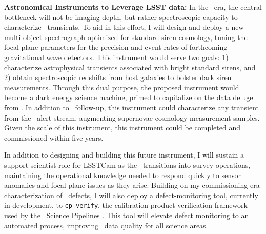 \textbf{Astronomical Instruments to Leverage LSST data:}
In the \LSST\ era, the central bottleneck will not be imaging depth, but rather spectroscopic capacity to characterize \LSST\ transients. To aid in this effort, I will design and deploy a new multi-object spectrograph optimized for standard siren cosmology, tuning the focal plane parameters for the precision and event rates of forthcoming gravitational wave detectors. This instrument would serve two goals: 1) characterize astrophysical transients associated with bright standard sirens, and 2) obtain spectroscopic redshifts from host galaxies to bolster dark siren measurements. Through this dual purpose, the proposed instrument would become a dark energy science machine, primed to capitalize on the data deluge from \LSST. In addition to \GW\ follow-up, this instrument could characterize any transient from the \LSST\ alert stream, augmenting supernovae cosmology measurement samples. Given the scale of this instrument, this instrument could be completed and commissioned within five years.

In addition to designing and building this future instrument, 
I will sustain a support-scientist role for LSSTCam as the \LSST\ transitions into survey operations, maintaining the operational knowledge needed to respond quickly to sensor anomalies and focal-plane issues as they arise.
Building on my commissioning-era characterization of \LSSTCam\ defects, I will also deploy a defect-monitoring tool, currently in-development, to \texttt{cp\_verify}, the calibration-product verification framework used by the \LSST\ Science Pipelines \cite{10.71929/rubin/2570545}. This tool will elevate defect monitoring to an automated process, improving \LSST\ data quality for all science areas.

